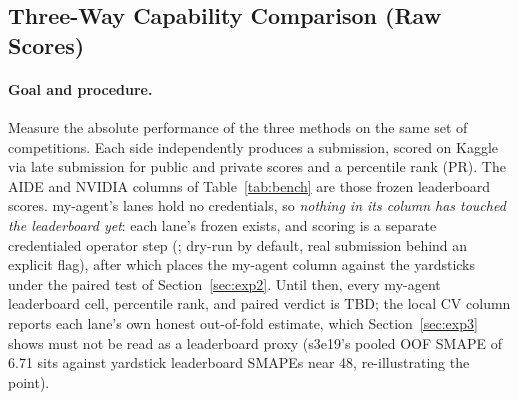 \documentclass[11pt,a4paper]{article}
\begin{document}
\subsection{Three-Way Capability Comparison (Raw Scores)}
\label{sec:exp1}

\paragraph{Goal and procedure.} Measure the absolute performance of the three methods on the same set of competitions. Each side independently produces a submission, scored on Kaggle via late submission for public and private scores and a percentile rank (PR). The AIDE and NVIDIA columns of Table~\ref{tab:bench} are those frozen leaderboard scores. my-agent's lanes hold no credentials, so \emph{nothing in its column has touched the leaderboard yet}: each lane's frozen  exists, and scoring is a separate credentialed operator step (; dry-run by default, real submission behind an explicit flag), after which  places the my-agent column against the yardsticks under the paired test of Section~\ref{sec:exp2}. Until then, every my-agent leaderboard cell, percentile rank, and paired verdict is TBD; the local CV column reports each lane's own honest out-of-fold estimate, which Section~\ref{sec:exp3} shows must not be read as a leaderboard proxy (s3e19's pooled OOF SMAPE of 6.71 sits against yardstick leaderboard SMAPEs near 48, re-illustrating the point).
\end{document}
